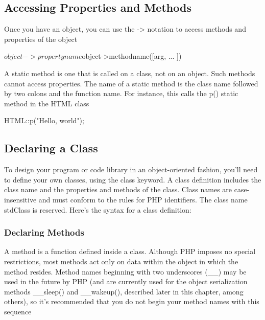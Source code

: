 \documentclass{report}
\begin{document}
\subsection{Accessing Properties and Methods}
\bigbreak \noindent 
Once you have an object, you can use the -> notation to access methods and properties of the object
\bigbreak \noindent 
\begin{phpcode}
$object->propertyname $object->methodname([arg, ... ])
\end{phpcode}
\bigbreak \noindent 
A static method is one that is called on a class, not on an object. Such methods cannot access properties. The name of a static method is the class name followed by two colons and the function name. For instance, this calls the p() static method in the HTML class
\bigbreak \noindent 
\begin{phpcode}
HTML::p("Hello, world");
\end{phpcode}

\bigbreak \noindent 
\subsection{Declaring a Class}
\bigbreak \noindent 
To design your program or code library in an object-oriented fashion, you’ll need to
define your own classes, using the class keyword. A class definition includes the class
name and the properties and methods of the class. Class names are case-insensitive and
must conform to the rules for PHP identifiers. The class name stdClass is reserved.
Here’s the syntax for a class definition:
\bigbreak \noindent 
{}

\bigbreak \noindent 
\subsubsection{Declaring Methods}
\bigbreak \noindent 
A method is a function defined inside a class. Although PHP imposes no special restrictions, most methods act only on data within the object in which the method resides.
Method names beginning with two underscores (\_\_) may be used in the future by PHP
(and are currently used for the object serialization methods \_\_sleep() and
\_\_wakeup(), described later in this chapter, among others), so it’s recommended that
you do not begin your method names with this sequence
\end{document}

